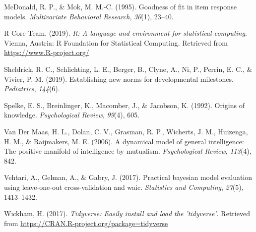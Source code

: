 \documentclass[10pt, letterpaper]{article}
\begin{document}
\leavevmode\hypertarget{ref-mcdonald1995goodness}{}%
McDonald, R. P., \& Mok, M. M.-C. (1995). Goodness of fit in item
response models. \emph{Multivariate Behavioral Research}, \emph{30}(1),
23--40.

\leavevmode\hypertarget{ref-rcore}{}%
R Core Team. (2019). \emph{R: A language and environment for statistical
computing}. Vienna, Austria: R Foundation for Statistical Computing.
Retrieved from \url{https://www.R-project.org/}

\leavevmode\hypertarget{ref-sheldrick2019establishing}{}%
Sheldrick, R. C., Schlichting, L. E., Berger, B., Clyne, A., Ni, P.,
Perrin, E. C., \& Vivier, P. M. (2019). Establishing new norms for
developmental milestones. \emph{Pediatrics}, \emph{144}(6).

\leavevmode\hypertarget{ref-spelke1992origins}{}%
Spelke, E. S., Breinlinger, K., Macomber, J., \& Jacobson, K. (1992).
Origins of knowledge. \emph{Psychological Review}, \emph{99}(4), 605.

\leavevmode\hypertarget{ref-van2006dynamical}{}%
Van Der Maas, H. L., Dolan, C. V., Grasman, R. P., Wicherts, J. M.,
Huizenga, H. M., \& Raijmakers, M. E. (2006). A dynamical model of
general intelligence: The positive manifold of intelligence by
mutualism. \emph{Psychological Review}, \emph{113}(4), 842.

\leavevmode\hypertarget{ref-vehtari2017practical}{}%
Vehtari, A., Gelman, A., \& Gabry, J. (2017). Practical bayesian model
evaluation using leave-one-out cross-validation and waic.
\emph{Statistics and Computing}, \emph{27}(5), 1413--1432.

\leavevmode\hypertarget{ref-tidy}{}%
Wickham, H. (2017). \emph{Tidyverse: Easily install and load the
'tidyverse'}. Retrieved from
\url{https://CRAN.R-project.org/package=tidyverse}


\end{document}
